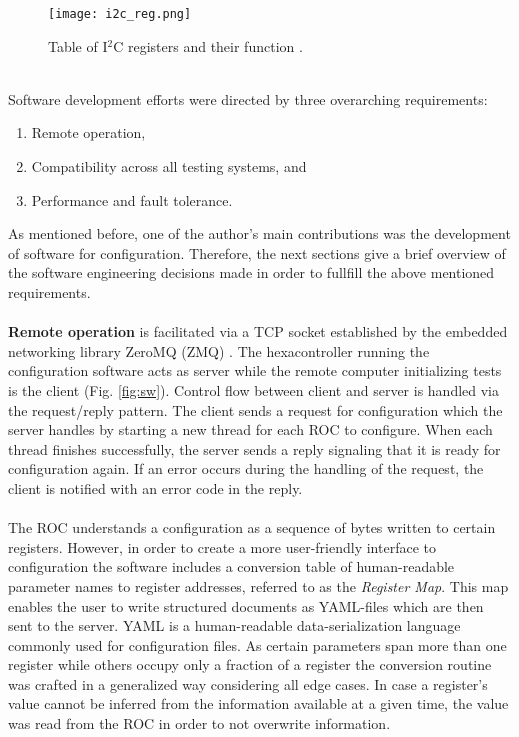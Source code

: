 \documentclass[../../main.tex]{subfiles}
\begin{document}
\begin{figure}[htp]
	\begin{center}
		\texttt{[image: i2c\_reg.png]}
		\caption{Table of I$^2$C registers and their function \cite{tdr_roc}.}
		\label{fig:i2c_reg}
	\end{center}
\end{figure}
\\
Software development efforts were directed by three overarching requirements:
\begin{enumerate}
\item Remote operation,
\item Compatibility across all testing systems, and
\item Performance and fault tolerance.
\end{enumerate}
As mentioned before, one of the author's main contributions was the development of software for configuration. Therefore, the next sections give a brief overview of the software engineering decisions made in order to fullfill the above mentioned requirements.\\
\\
\textbf{Remote operation} is facilitated via a TCP socket established by the embedded networking library ZeroMQ (ZMQ) \cite{zmq}. The hexacontroller running the configuration software acts as server while the remote computer initializing tests is the client (Fig. \ref{fig:sw}). Control flow between client and server is handled via the request/reply pattern. The client sends a request for configuration which the server handles by starting a new thread for each ROC to configure. When each thread finishes successfully, the server sends a reply signaling that it is ready for configuration again. If an error occurs during the handling of the request, the client is notified with an error code in the reply.\\
\\
The ROC understands a configuration as a sequence of bytes written to certain registers. However, in order to create a more user-friendly interface to configuration the software includes a conversion table of human-readable parameter names to register addresses, referred to as the \textit{Register Map}. This map enables the user to write structured documents as YAML-files which are then sent to the server. YAML is a human-readable data-serialization language commonly used for configuration files. As certain parameters span more than one register while others occupy only a fraction of a register the conversion routine was crafted in a generalized way considering all edge cases. In case a register's value cannot be inferred from the information available at a given time, the value was read from the ROC in order to not overwrite information.\\
\end{document}
